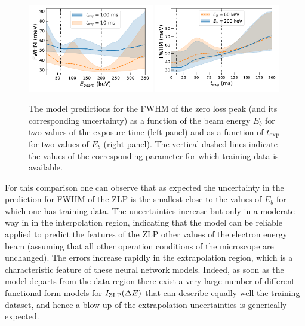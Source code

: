 \begin{figure}[H]
    \centering
    \includegraphics[width=0.49\textwidth]{plots/Ebeam_extrapolation.pdf}
    \includegraphics[width=0.49\textwidth]{plots/time_extrapolation.pdf}
    \caption{The model predictions for the FWHM of the zero loss peak
      (and its corresponding uncertainty) as a function of the beam energy $E_b$
      for two values of the exposure time (left panel)
      and as a function of $t_{\rm exp}$ for two values of $E_b$ (right panel).
      The vertical dashed lines indicate the values of the
      corresponding parameter for which training data is available.
    }
\label{fig:extrapolbeam}
\end{figure}

For this comparison one can observe that as expected the uncertainty in the  prediction for FWHM
of the ZLP is the smallest close to the values of $E_b$ for which one has training data.
%
The uncertainties increase but only in a moderate way in in the interpolation region, indicating that
the model can be reliable applied to predict the features of the ZLP other values of the electron
energy beam (assuming that all other operation conditions of the microscope are unchanged).
%
The errors increase rapidly in the extrapolation region, which is a characteristic feature of
these neural network models.
%
Indeed, as soon as the model departs from the data region there exist a very large
number of different functional form models for $I_{\rm ZLP}(\Delta E)$ that can describe equally well
the training dataset, and hence a blow up of the extrapolation uncertainties is generically expected.

